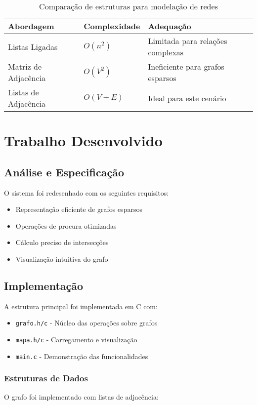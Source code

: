 \documentclass[a4paper,12pt]{report}
\begin{document}
\begin{table}[H]
\centering
\begin{tabular}{lll}
\toprule
\textbf{Abordagem} & \textbf{Complexidade} & \textbf{Adequação} \\
\midrule
Listas Ligadas & \(O(n^2)\) & Limitada para relações complexas \\
Matriz de Adjacência & \(O(V^2)\) & Ineficiente para grafos esparsos \\
Listas de Adjacência & \(O(V+E)\) & Ideal para este cenário \\
\bottomrule
\end{tabular}
\caption{Comparação de estruturas para modelação de redes}
\label{tab:comparativo_grafos}
\end{table}

\chapter{Trabalho Desenvolvido}
\section{Análise e Especificação}
O sistema foi redesenhado com os seguintes requisitos:

\begin{itemize}
    \item Representação eficiente de grafos esparsos
    \item Operações de procura otimizadas
    \item Cálculo preciso de intersecções
    \item Visualização intuitiva do grafo
\end{itemize}

\section{Implementação}
A estrutura principal foi implementada em C com:

\begin{itemize}
    \item \texttt{grafo.h/c} - Núcleo das operações sobre grafos
    \item \texttt{mapa.h/c} - Carregamento e visualização
    \item \texttt{main.c} - Demonstração das funcionalidades
\end{itemize}

\subsection{Estruturas de Dados}
O grafo foi implementado com listas de adjacência:
\end{document}
